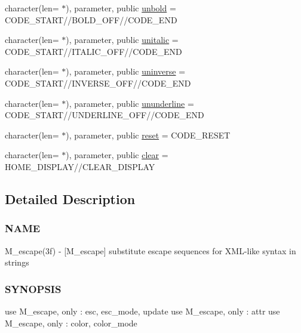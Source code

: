 \begin{DoxyCompactItemize}
\item 
character(len= $\ast$), parameter, public \mbox{\hyperlink{namespacem__escape_aaa2404c29a0f5840417e71a8219a118c}{unbold}} = C\+O\+D\+E\+\_\+\+S\+T\+A\+RT//B\+O\+L\+D\+\_\+\+O\+FF//C\+O\+D\+E\+\_\+\+E\+ND
\item 
character(len= $\ast$), parameter, public \mbox{\hyperlink{namespacem__escape_a6b95826bb2793069e7fa8f8386bdb520}{unitalic}} = C\+O\+D\+E\+\_\+\+S\+T\+A\+RT//I\+T\+A\+L\+I\+C\+\_\+\+O\+FF//C\+O\+D\+E\+\_\+\+E\+ND
\item 
character(len= $\ast$), parameter, public \mbox{\hyperlink{namespacem__escape_a067207898e3ef5118bc1cad83f40dad8}{uninverse}} = C\+O\+D\+E\+\_\+\+S\+T\+A\+RT//I\+N\+V\+E\+R\+S\+E\+\_\+\+O\+FF//C\+O\+D\+E\+\_\+\+E\+ND
\item 
character(len= $\ast$), parameter, public \mbox{\hyperlink{namespacem__escape_adbaa599772d5df6567d75188ac3258bf}{ununderline}} = C\+O\+D\+E\+\_\+\+S\+T\+A\+RT//U\+N\+D\+E\+R\+L\+I\+N\+E\+\_\+\+O\+FF//C\+O\+D\+E\+\_\+\+E\+ND
\item 
character(len= $\ast$), parameter, public \mbox{\hyperlink{namespacem__escape_ae02be34bb084db8024b234bc87058d3a}{reset}} = C\+O\+D\+E\+\_\+\+R\+E\+S\+ET
\item 
character(len= $\ast$), parameter, public \mbox{\hyperlink{namespacem__escape_a49210f3a0332fb37df08c519b3252bef}{clear}} = H\+O\+M\+E\+\_\+\+D\+I\+S\+P\+L\+AY//C\+L\+E\+A\+R\+\_\+\+D\+I\+S\+P\+L\+AY
\end{DoxyCompactItemize}


\subsection{Detailed Description}
\subsubsection*{N\+A\+ME}

M\+\_\+escape(3f) -\/ \mbox{[}M\+\_\+escape\mbox{]} substitute escape sequences for X\+M\+L-\/like syntax in strings 

\subsubsection*{S\+Y\+N\+O\+P\+S\+IS}

\begin{DoxyVerb} use M_escape, only : esc, esc_mode, update
 use M_escape, only : attr
 use M_escape, only : color, color_mode
\end{DoxyVerb}


